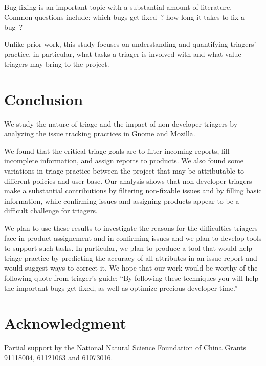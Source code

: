 \documentclass[conference]{IEEEtran}
\begin{document}
Bug fixing is an important topic with
a substantial amount of literature. Common questions include: which bugs get
fixed~\cite{ms10}? how long it takes to fix a bug~\cite{kim2006}?

Unlike prior work, this study focuses on understanding and quantifying
triagers' practice, in particular, what tasks a triager is involved with
and what value triagers may bring to the project.

\section{Conclusion}\label{s:conclusion}
We study the nature of triage and the impact of non-developer
triagers by analyzing the issue tracking practices in Gnome and Mozilla.

We found that the critical triage goals are to filter incoming
reports, fill incomplete information, and assign reports to
products. We also found some variations in triage practice between
the project that may be attributable to different policies and user
base. Our analysis shows that non-developer triagers make a substantial
contributions by filtering non-fixable issues and by filling basic
information, while confirming issues and assigning products
appear to be a difficult challenge for triagers.

We plan to use these results to investigate the reasons for the
difficulties triagers face in product assignement and in confirming
issues and we plan to develop tools to support such tasks.  In
particular, we plan to produce a tool that would help triage
practice by predicting the accuracy of all attributes in an issue
report and would suggest ways to correct it.  We hope that our work
would be worthy of the following quote from triager's guide:
``By following these techniques you will help the important bugs
  get fixed, as well as optimize precious developer time.''

\section{Acknowledgment}
Partial support by the National Natural Science Foundation of China
Grants 91118004, 61121063 and 61073016.

\balance



\end{document}
